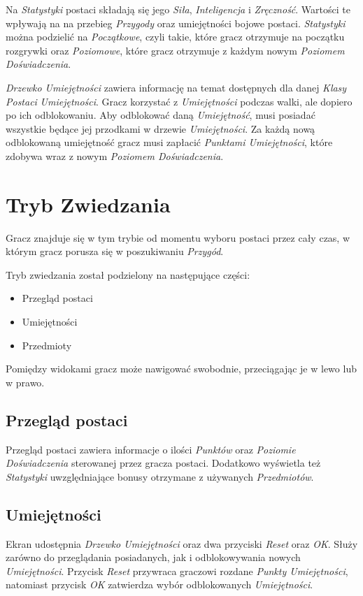 \documentclass[openright]{xmgr}
\begin{document}
Na \textit{Statystyki} postaci składają się  jego \textit{Siła}, \textit{Inteligencja} i \textit{Zręczność}. Wartości te wpływają na na przebieg \textit{Przygody} oraz umiejętności bojowe postaci. \textit{Statystyki} można podzielić na \textit{Początkowe}, czyli takie, które gracz otrzymuje na początku rozgrywki oraz \textit{Poziomowe}, które gracz otrzymuje z każdym nowym \textit{Poziomem Doświadczenia}.

\textit{Drzewko Umiejętności} zawiera informację na temat dostępnych dla danej \textit{Klasy Postaci} \textit{Umiejętności}. Gracz korzystać z \textit{Umiejętności} podczas walki, ale dopiero po ich odblokowaniu. Aby odblokować daną \textit{Umiejętność}, musi posiadać wszystkie będące jej przodkami w drzewie \textit{Umiejętności}. Za każdą nową odblokowaną umiejętność gracz musi zapłacić \textit{Punktami Umiejętności}, które zdobywa wraz z nowym \textit{Poziomem Doświadczenia}.

\section{Tryb Zwiedzania}

Gracz znajduje się w tym trybie od momentu wyboru postaci przez cały czas, w którym gracz porusza się w poszukiwaniu \textit{Przygód}. 

Tryb zwiedzania został podzielony na następujące części: 
\begin{itemize}
	\item Przegląd postaci
	\item Umiejętności
	\item Przedmioty
\end{itemize}
Pomiędzy widokami gracz może nawigować swobodnie, przeciągając je w lewo lub w prawo.
\subsection*{Przegląd postaci}
Przegląd postaci zawiera informacje o ilości \textit{Punktów} oraz \textit{Poziomie Doświadczenia} sterowanej przez gracza postaci. Dodatkowo wyświetla też \textit{Statystyki} uwzględniające bonusy otrzymane z używanych \textit{Przedmiotów}.
\subsection*{Umiejętności}
Ekran udostępnia \textit{Drzewko Umiejętności} oraz dwa przyciski \textit{Reset} oraz \textit{OK}. Służy zarówno do przeglądania posiadanych, jak i odblokowywania nowych \textit{Umiejętności}. Przycisk \textit{Reset} przywraca graczowi rozdane \textit{Punkty Umiejętności}, natomiast przycisk \textit{OK} zatwierdza wybór odblokowanych \textit{Umiejętności}.
\end{document}

